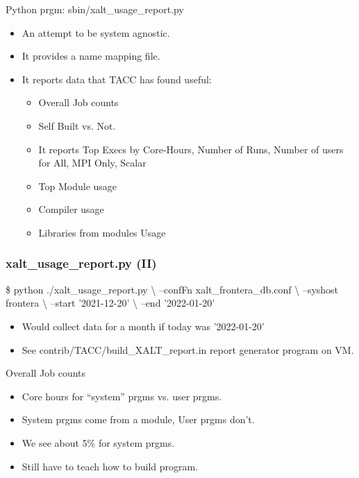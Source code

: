 \documentclass{beamer}
\begin{document}
\begin{frame}{Python prgm: sbin/xalt\_usage\_report.py}
  \begin{itemize}
    \item An attempt to be system agnostic.
    \item It provides a name mapping file.
    \item It reports data that TACC has found useful:
      \begin{itemize}
        \item Overall Job counts
        \item Self Built vs. Not.
        \item It reports Top Execs by Core-Hours, Number of Runs,
          Number of users for All, MPI Only, Scalar
        \item Top Module usage
        \item Compiler usage
        \item Libraries from modules Usage
      \end{itemize}
  \end{itemize}
\end{frame}

\begin{frame}[fragile]
    \frametitle{xalt\_usage\_report.py (II)}
 {\small
    \begin{semiverbatim}
\$ python ./xalt_usage_report.py           \textbackslash
        --confFn xalt_frontera_db.conf    \textbackslash
        --syshost frontera                \textbackslash
        --start '2021-12-20'              \textbackslash
        --end   '2022-01-20'
    \end{semiverbatim}
}
  \begin{itemize}
    \item Would collect data for a month if today was '2022-01-20'
    \item See contrib/TACC/build\_XALT\_report.in report generator
      program on VM.
  \end{itemize}

\end{frame}

\begin{frame}{Overall Job counts}
  \begin{itemize}
    \item Core hours for ``system'' prgms vs. user prgms.
    \item System prgms come from a module, User prgms don't.
    \item We see about 5\% for system prgms.
    \item Still have to teach how to build program.
  \end{itemize}
\end{frame}
\end{document}

